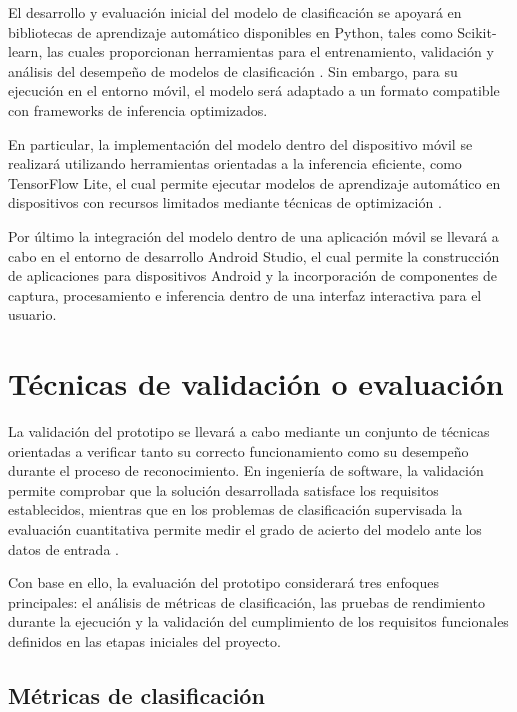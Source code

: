 	El desarrollo y evaluación inicial del modelo de clasificación se apoyará en
	bibliotecas de aprendizaje automático disponibles en Python, tales como
	Scikit-learn, las cuales proporcionan herramientas para el entrenamiento,
	validación y análisis del desempeño de modelos de clasificación
	\cite{scikit-learn}. Sin embargo, para su ejecución en el entorno móvil, el
	modelo será adaptado a un formato compatible con frameworks de inferencia
	optimizados.
	
	En particular, la implementación del modelo dentro del dispositivo móvil se
	realizará utilizando herramientas orientadas a la inferencia eficiente, como
	TensorFlow Lite, el cual permite ejecutar modelos de aprendizaje automático
	en dispositivos con recursos limitados mediante técnicas de optimización
	\cite{tensorflow_lite}.
	
	Por último la integración del modelo dentro de una aplicación móvil se
	llevará a cabo en el entorno de desarrollo Android Studio, el cual permite la
	construcción de aplicaciones para dispositivos Android y la incorporación de
	componentes de captura, procesamiento e inferencia dentro de una interfaz
	interactiva para el usuario.
	
	\section{Técnicas de validación o evaluación}
	
	La validación del prototipo se llevará a cabo mediante un conjunto de técnicas
	orientadas a verificar tanto su correcto funcionamiento como su desempeño
	durante el proceso de reconocimiento. En ingeniería de software, la validación
	permite comprobar que la solución desarrollada satisface los requisitos
	establecidos, mientras que en los problemas de clasificación supervisada la
	evaluación cuantitativa permite medir el grado de acierto del modelo ante los
	datos de entrada \cite{pressman2014,sommerville2016,bishop2006}.
	
	Con base en ello, la evaluación del prototipo considerará tres enfoques
	principales: el análisis de métricas de clasificación, las pruebas de
	rendimiento durante la ejecución y la validación del cumplimiento de los
	requisitos funcionales definidos en las etapas iniciales del proyecto.
	
	\subsection{Métricas de clasificación}
	
